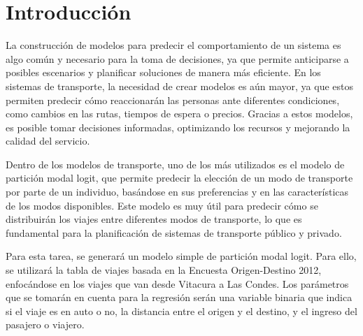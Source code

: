 \section{Introducción}

La construcción de modelos para predecir el comportamiento de un sistema es algo común y necesario para la toma de decisiones, ya que permite anticiparse a posibles escenarios y planificar soluciones de manera más eficiente. En los sistemas de transporte, la necesidad de crear modelos es aún mayor, ya que estos permiten predecir cómo reaccionarán las personas ante diferentes condiciones, como cambios en las rutas, tiempos de espera o precios. Gracias a estos modelos, es posible tomar decisiones informadas, optimizando los recursos y mejorando la calidad del servicio. 

Dentro de los modelos de transporte, uno de los más utilizados es el modelo de partición modal logit, que permite predecir la elección de un modo de transporte por parte de un individuo, basándose en sus preferencias y en las características de los modos disponibles. Este modelo es muy útil para predecir cómo se distribuirán los viajes entre diferentes modos de transporte, lo que es fundamental para la planificación de sistemas de transporte público y privado.

Para esta tarea, se generará un modelo simple de partición modal logit. Para ello, se utilizará la tabla de viajes basada en la Encuesta Origen-Destino 2012, enfocándose en los viajes que van desde Vitacura a Las Condes. Los parámetros que se tomarán en cuenta para la regresión serán una variable binaria que indica si el viaje es en auto o no, la distancia entre el origen y el destino, y el ingreso del pasajero o viajero.

